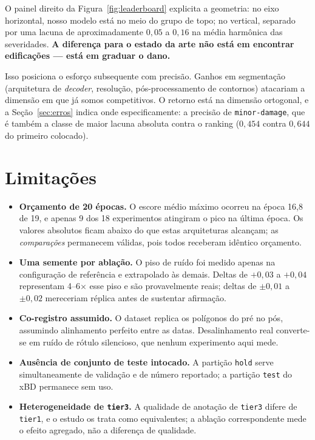 \documentclass[11pt,a4paper]{article}
\begin{document}
O painel direito da Figura~\ref{fig:leaderboard} explicita a geometria: no eixo
horizontal, nosso modelo está no meio do grupo de topo; no vertical, separado
por uma lacuna de aproximadamente $0{,}05$ a $0{,}16$ na média harmônica das
severidades. \textbf{A diferença para o estado da arte não está em encontrar
edificações --- está em graduar o dano.}

Isso posiciona o esforço subsequente com precisão. Ganhos em segmentação
(arquitetura de \emph{decoder}, resolução, pós-processamento de contornos)
atacariam a dimensão em que já somos competitivos. O retorno está na dimensão
ortogonal, e a Seção~\ref{sec:erros} indica onde especificamente: a precisão de
\texttt{minor-damage}, que é também a classe de maior lacuna absoluta contra o
ranking ($0{,}454$ contra $0{,}644$ do primeiro colocado).

\section{Limitações}

\begin{itemize}
  \item \textbf{Orçamento de 20 épocas.} O escore médio máximo ocorreu na época
  16{,}8 de 19, e apenas 9 dos 18 experimentos atingiram o pico na última época.
  Os valores absolutos ficam abaixo do que estas arquiteturas alcançam; as
  \emph{comparações} permanecem válidas, pois todos receberam idêntico orçamento.

  \item \textbf{Uma semente por ablação.} O piso de ruído foi medido apenas na
  configuração de referência e extrapolado às demais. Deltas de $+0{,}03$ a
  $+0{,}04$ representam 4--6$\times$ esse piso e são provavelmente reais; deltas
  de $\pm0{,}01$ a $\pm0{,}02$ mereceriam réplica antes de sustentar afirmação.

  \item \textbf{Co-registro assumido.} O dataset replica os polígonos do pré no
  pós, assumindo alinhamento perfeito entre as datas. Desalinhamento real
  converte-se em ruído de rótulo silencioso, que nenhum experimento aqui mede.

  \item \textbf{Ausência de conjunto de teste intocado.} A partição
  \texttt{hold} serve simultaneamente de validação e de número reportado; a
  partição \texttt{test} do xBD permanece sem uso.

  \item \textbf{Heterogeneidade de \texttt{tier3}.} A qualidade de anotação de
  \texttt{tier3} difere de \texttt{tier1}, e o estudo os trata como
  equivalentes; a ablação correspondente mede o efeito agregado, não a diferença
  de qualidade.
\end{itemize}
\end{document}
